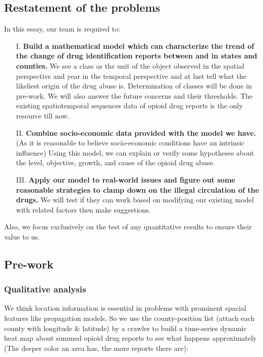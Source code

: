 \documentclass{mcmthesis}
\begin{document}
\subsection{Restatement of the problems}
In this essay, our team is required to:
\begin{itemize}
\item[I. ] \textbf{Build a mathematical model which can characterize the trend of the change of drug identification reports between and in states and counties.} We see a class as the unit of the object observed in the spatial perspective and year in the temporal perspective and at last tell what the likeliest origin of the drug abuse is. Determination of classes will be done in pre-work. We will also answer the future concerns and their thresholds. The existing spatiotemporal sequences data of opioid drug reports is the only resource till now.
\item[II. ] \textbf{Combine socio-economic data provided with the model we have.} (As it is reasonable to believe socio-economic conditions have an intrinsic influence) Using this model, we can explain or verify some hypotheses about the level, objective, growth, and cause of the opioid drug abuse.

\item[III. ] \textbf{Apply our model to real-world issues and figure out some reasonable strategies to clamp down on the illegal circulation of the drugs.} We will test if they can work based on modifying our existing model with related factors then make suggestions.

\end{itemize}
Also, we focus exclusively on the test of any quantitative results to ensure their value to us.

\subsection{Pre-work}
\subsubsection{Qualitative analysis}
We think location information is essential in problems with prominent spacial features like propagation models. So we use the county-position list (attach each county with longitude \& latitude) by a crawler to build a time-series dynamic heat map about summed opioid drug reports to see what happens approximately (The deeper color an area has, the more reports there are):
\end{document}

